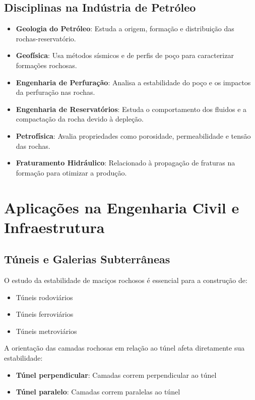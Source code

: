\documentclass[12pt,a4paper,twoside]{book}
\begin{document}
\subsection{Disciplinas na Indústria de Petróleo}

\begin{itemize}
    \item \textbf{Geologia do Petróleo}: Estuda a origem, formação e distribuição das rochas-reservatório.
    \item \textbf{Geofísica}: Usa métodos sísmicos e de perfis de poço para caracterizar formações rochosas.
    \item \textbf{Engenharia de Perfuração}: Analisa a estabilidade do poço e os impactos da 
    perfuração nas rochas.
    \item \textbf{Engenharia de Reservatórios}: Estuda o comportamento dos fluidos e a compactação 
    da rocha devido à depleção.
    \item \textbf{Petrofísica}: Avalia propriedades como porosidade, permeabilidade e tensão das rochas.
    \item \textbf{Fraturamento Hidráulico}: Relacionado à propagação de fraturas na formação para 
    otimizar a produção.
\end{itemize}

\section{Aplicações na Engenharia Civil e Infraestrutura}

\subsection{Túneis e Galerias Subterrâneas}

O estudo da estabilidade de maciços rochosos é essencial para a construção de:
\begin{itemize}
    \item Túneis rodoviários
    \item Túneis ferroviários
    \item Túneis metroviários
\end{itemize}

A orientação das camadas rochosas em relação ao túnel afeta diretamente sua estabilidade:
\begin{itemize}
    \item \textbf{Túnel perpendicular}: Camadas correm perpendicular ao túnel
    \item \textbf{Túnel paralelo}: Camadas correm paralelas ao túnel
\end{itemize}
\end{document}
